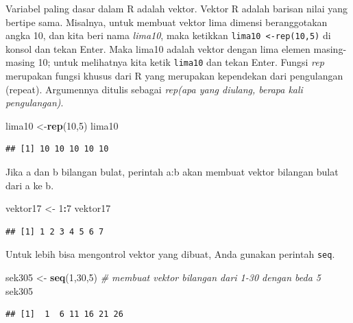 \documentclass[a4paper, nobind]{templates/ociamthesis}
\newenvironment{Shaded}{\begin{snugshade}}{\end{snugshade}}
\newcommand{\CommentTok}[1]{\textcolor[rgb]{0.56,0.35,0.01}{\textit{#1}}}
\newcommand{\DecValTok}[1]{\textcolor[rgb]{0.00,0.00,0.81}{#1}}
\newcommand{\FunctionTok}[1]{\textcolor[rgb]{0.13,0.29,0.53}{\textbf{#1}}}
\newcommand{\NormalTok}[1]{#1}
\newcommand{\OtherTok}[1]{\textcolor[rgb]{0.56,0.35,0.01}{#1}}
\newcommand{\SpecialCharTok}[1]{\textcolor[rgb]{0.81,0.36,0.00}{\textbf{#1}}}
\renewenvironment{Shaded}
{
  \vspace{10pt}%
  \begin{snugshade}%
}{%
  \end{snugshade}%
  \vspace{8pt}%
}
\begin{document}
Variabel paling dasar dalam R adalah vektor. Vektor R adalah barisan nilai yang bertipe sama. Misalnya, untuk membuat vektor lima dimensi beranggotakan angka 10, dan kita beri nama \emph{lima10}, maka ketikkan \texttt{lima10\ \textless{}-rep(10,5)} di konsol dan tekan Enter. Maka lima10 adalah vektor dengan lima elemen masing-masing 10; untuk melihatnya kita ketik \texttt{lima10} dan tekan Enter. Fungsi \emph{rep} merupakan fungsi khusus dari R yang merupakan kependekan dari pengulangan (repeat). Argumennya ditulis sebagai \emph{rep(apa yang diulang, berapa kali pengulangan)}.

\begin{Shaded}
\begin{Highlighting}[]
\NormalTok{lima10 }\OtherTok{\textless{}{-}}\FunctionTok{rep}\NormalTok{(}\DecValTok{10}\NormalTok{,}\DecValTok{5}\NormalTok{)}
\NormalTok{lima10}
\end{Highlighting}
\end{Shaded}

\begin{verbatim}
## [1] 10 10 10 10 10
\end{verbatim}

Jika a dan b bilangan bulat, perintah a:b akan membuat vektor bilangan bulat dari a ke b.

\begin{Shaded}
\begin{Highlighting}[]
\NormalTok{vektor17 }\OtherTok{\textless{}{-}} \DecValTok{1}\SpecialCharTok{:}\DecValTok{7}
\NormalTok{vektor17}
\end{Highlighting}
\end{Shaded}

\begin{verbatim}
## [1] 1 2 3 4 5 6 7
\end{verbatim}

Untuk lebih bisa mengontrol vektor yang dibuat, Anda gunakan perintah \texttt{seq}.

\begin{Shaded}
\begin{Highlighting}[]
\NormalTok{sek305 }\OtherTok{\textless{}{-}} \FunctionTok{seq}\NormalTok{(}\DecValTok{1}\NormalTok{,}\DecValTok{30}\NormalTok{,}\DecValTok{5}\NormalTok{) }\CommentTok{\# membuat vektor bilangan dari 1{-}30 dengan beda 5}
\NormalTok{sek305}
\end{Highlighting}
\end{Shaded}

\begin{verbatim}
## [1]  1  6 11 16 21 26
\end{verbatim}
\end{document}
